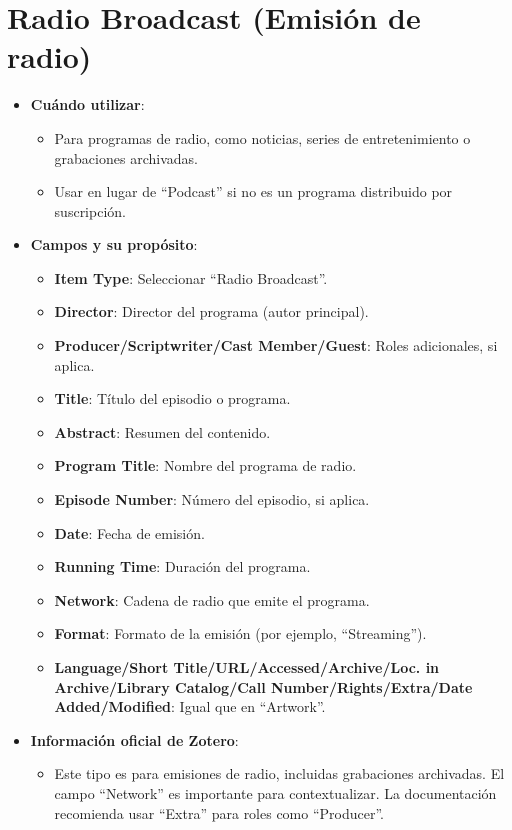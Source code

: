 \documentclass[
  jou,
  floatsintext,
  longtable,
  a4paper,
  nolmodern,
  notxfonts,
  notimes,
  12pt,
  colorlinks=true,linkcolor=blue,citecolor=blue,urlcolor=blue]{apa7}
\providecommand{\tightlist}{%
  \setlength{\itemsep}{0pt}\setlength{\parskip}{0pt}}
\begin{document}
\section{Radio Broadcast (Emisión de
radio)}\label{radio-broadcast-emisiuxf3n-de-radio}

\begin{itemize}
\tightlist
\item
  \textbf{Cuándo utilizar}:

  \begin{itemize}
  \tightlist
  \item
    Para programas de radio, como noticias, series de entretenimiento o
    grabaciones archivadas.
  \item
    Usar en lugar de ``Podcast'' si no es un programa distribuido por
    suscripción.
  \end{itemize}
\item
  \textbf{Campos y su propósito}:

  \begin{itemize}
  \tightlist
  \item
    \textbf{Item Type}: Seleccionar ``Radio Broadcast''.
  \item
    \textbf{Director}: Director del programa (autor principal).
  \item
    \textbf{Producer/Scriptwriter/Cast Member/Guest}: Roles adicionales,
    si aplica.
  \item
    \textbf{Title}: Título del episodio o programa.
  \item
    \textbf{Abstract}: Resumen del contenido.
  \item
    \textbf{Program Title}: Nombre del programa de radio.
  \item
    \textbf{Episode Number}: Número del episodio, si aplica.
  \item
    \textbf{Date}: Fecha de emisión.
  \item
    \textbf{Running Time}: Duración del programa.
  \item
    \textbf{Network}: Cadena de radio que emite el programa.
  \item
    \textbf{Format}: Formato de la emisión (por ejemplo, ``Streaming'').
  \item
    \textbf{Language/Short Title/URL/Accessed/Archive/Loc. in
    Archive/Library Catalog/Call Number/Rights/Extra/Date
    Added/Modified}: Igual que en ``Artwork''.
  \end{itemize}
\item
  \textbf{Información oficial de Zotero}:

  \begin{itemize}
  \tightlist
  \item
    Este tipo es para emisiones de radio, incluidas grabaciones
    archivadas. El campo ``Network'' es importante para contextualizar.
    La documentación recomienda usar ``Extra'' para roles como
    ``Producer''.
  \end{itemize}
\end{itemize}
\end{document}
